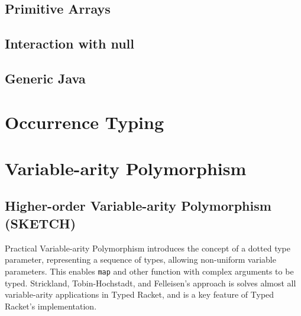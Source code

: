 \documentclass{cshonours}
\begin{document}
\subsection{Primitive Arrays}

\subsection{Interaction with null}
% 

\subsection{Generic Java}

\section{Occurrence Typing}

\section{Variable-arity Polymorphism}

\subsection{Higher-order Variable-arity Polymorphism (SKETCH)}

Practical Variable-arity Polymorphism introduces the concept of a dotted type parameter,
representing a sequence of types, allowing non-uniform variable parameters.
This enables \lstinline|map| and other function with complex arguments to be typed.
Strickland, Tobin-Hochstadt, and Felleisen's approach is solves almost all variable-arity applications in
Typed Racket, and is a key feature of Typed Racket's implementation.
\end{document}
